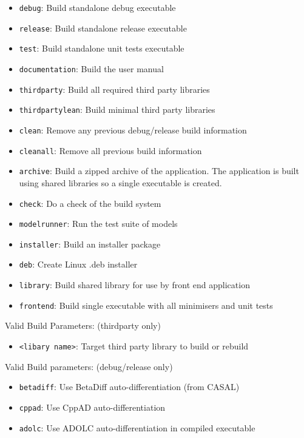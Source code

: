 \begin{itemize}
  \item \texttt{debug}:  Build standalone debug executable
  \item \texttt{release}: Build standalone release executable
  \item \texttt{test}: Build standalone unit tests executable
  \item \texttt{documentation}: Build the user manual
  \item \texttt{thirdparty}: Build all required third party libraries
  \item \texttt{thirdpartylean}: Build minimal third party libraries
  \item \texttt{clean}: Remove any previous debug/release build information
  \item \texttt{cleanall}: Remove all previous build information
  \item \texttt{archive}: Build a zipped archive of the application. The application is built using shared libraries so a single \CNAME executable is created. 
  \item \texttt{check}: Do a check of the build system
  \item \texttt{modelrunner}: Run the test suite of models
  \item \texttt{installer}: Build an installer package
  \item \texttt{deb}: Create Linux .deb installer
  \item \texttt{library}: Build shared library for use by front end application
  \item \texttt{frontend}: Build single \CNAME executable with all minimisers and unit tests
\end{itemize}

Valid Build Parameters: (thirdparty only)
\begin{itemize}
  \item \texttt{<libary name>}: Target third party library to build or rebuild
\end{itemize}

Valid Build parameters: (debug/release only)
\begin{itemize}
  \item \texttt{betadiff}: Use BetaDiff auto-differentiation (from CASAL)
  \item \texttt{cppad}: Use CppAD auto-differentiation
  \item \texttt{adolc}: Use ADOLC auto-differentiation in compiled executable
\end{itemize}

